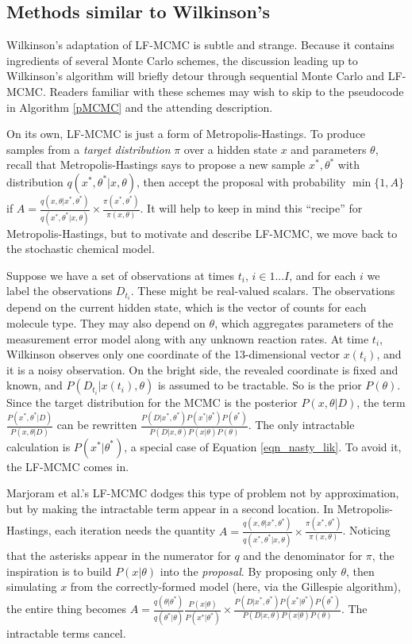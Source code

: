 \documentclass{article}
\begin{document}
\subsection{Methods similar to Wilkinson's}
\label{MC_backgr}
Wilkinson's adaptation of LF-MCMC is subtle and strange. Because it contains ingredients of several Monte Carlo schemes, the discussion leading up to Wilkinson's algorithm will briefly detour through sequential Monte Carlo and LF-MCMC. Readers familiar with these schemes may wish to skip to the pseudocode in Algorithm \ref{pMCMC} and the attending description. 

On its own, LF-MCMC is just a form of Metropolis-Hastings. To produce samples from a {\it target distribution} $\pi$ over a hidden state $x$ and parameters $\theta$, recall that Metropolis-Hastings says to propose a new sample $x^*, \theta^*$ with distribution $q(x^*, \theta^*|x, \theta)$, then accept the proposal with probability $\min \{1, A\}$ if $A=\frac{q(x, \theta|x^*, \theta^*)}{q(x^*, \theta^*|x, \theta)} \times \frac{\pi(x^*, \theta^*)}{\pi(x, \theta)}$. It will help to keep in mind this ``recipe'' for Metropolis-Hastings, but to motivate and describe LF-MCMC, we move back to the stochastic chemical model.

Suppose we have a set of observations at times $t_i$, $i \in 1...I$, and for each $i$ we label the observations $D_{t_i}$. These might be real-valued scalars. The observations depend on the current hidden state, which is the vector of counts for each molecule type. They may also depend on $\theta$, which aggregates parameters of the measurement error model along with any unknown reaction rates. At time $t_i$, Wilkinson observes only one coordinate of the 13-dimensional vector $x(t_i)$, and it is a noisy observation. On the bright side, the revealed coordinate is fixed and known, and $P(D_{t_{i}}|x(t_i), \theta)$ is assumed to be tractable. So is the prior $P(\theta)$. Since the target distribution for the MCMC is the posterior $P(x, \theta|D)$, the term $\frac{P(x^*, \theta^*|D)}{P(x, \theta|D)}$ can be rewritten $\frac{P(D|x^*, \theta^*)P(x^*|\theta^*)P(\theta^*)}{P(D|x, \theta)P(x| \theta)P(\theta)}$. The only intractable calculation is $P(x^*|\theta^*)$, a special case of Equation \ref{eqn_nasty_lik}. To avoid it, the LF-MCMC comes in.

Marjoram et al.'s LF-MCMC dodges this type of problem not by approximation, but by making the intractable term appear in a second location. In Metropolis-Hastings, each iteration needs the quantity $A=\frac{q(x, \theta|x^*, \theta^*)}{q(x^*, \theta^*|x, \theta)} \times \frac{\pi(x^*, \theta^*)}{\pi(x, \theta)}$. Noticing that the asterisks appear in the numerator for $q$ and the denominator for $\pi$, the inspiration is to build $P(x| \theta)$ into the {\it proposal}. By proposing only $\theta$, then simulating $x$ from the correctly-formed model (here, via the Gillespie algorithm), the entire thing becomes $A=\frac{q(\theta|\theta^*)}{q(\theta^*|\theta)} \frac{P(x|\theta)}{P(x^*|\theta^*)} \times \frac{P(D|x^*, \theta^*)P(x^*|\theta^*)P(\theta^*)}{P(D|x, \theta)P(x| \theta)P(\theta)}$. The intractable terms cancel.
\end{document}
